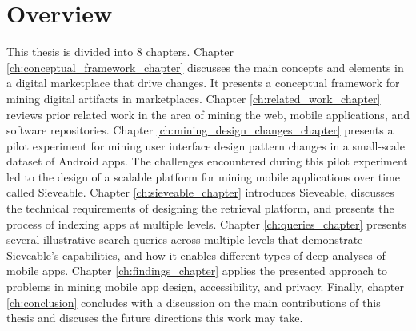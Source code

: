 \section{Overview}
This thesis is divided into 8 chapters.
Chapter \ref{ch:conceptual_framework_chapter} discusses the main concepts and elements in a digital marketplace that drive changes.
It presents a conceptual framework for mining digital artifacts in marketplaces.
Chapter \ref{ch:related_work_chapter} reviews prior related work in the area of mining the web, mobile applications, and software repositories.
Chapter \ref{ch:mining_design_changes_chapter} presents a pilot experiment for mining user interface design pattern changes in a small-scale dataset of Android apps.
The challenges encountered during this pilot experiment led to the design of a scalable platform for mining mobile applications over time called Sieveable.
Chapter \ref{ch:sieveable_chapter} introduces Sieveable, discusses the technical requirements of designing the retrieval platform, and presents the process of indexing apps at multiple levels.
Chapter \ref{ch:queries_chapter} presents several illustrative search queries across multiple levels that demonstrate Sieveable's capabilities, and how it enables different types of deep analyses of mobile apps.
Chapter \ref{ch:findings_chapter} applies the presented approach to problems in mining mobile app design, accessibility, and privacy.
Finally, chapter \ref{ch:conclusion} concludes with a discussion on the main contributions of this thesis and discuses the future directions this work may take.
